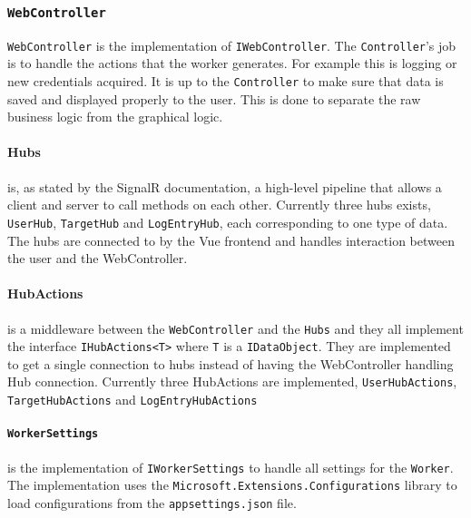 \documentclass{article}
\begin{document}
\subsubsection{\texttt{WebController}} \texttt{WebController} is the implementation of \texttt{IWebController}. The \texttt{Controller}'s job is to handle the actions that the worker generates. For example this is logging or new credentials acquired. It is up to the \texttt{Controller} to make sure that data is saved and displayed properly to the user. This is done to separate the raw business logic from the graphical logic.

\paragraph{Hubs} is, as stated by the SignalR documentation, a high-level pipeline that allows a client and server to call methods on each other\cite{url:implementation:signalr}. Currently three hubs exists, \texttt{UserHub}, \texttt{TargetHub} and \texttt{LogEntryHub}, each corresponding to one type of data. The hubs are connected to by the Vue frontend and handles interaction between the user and the WebController.

\paragraph{HubActions} is a middleware between the \texttt{WebController} and the \texttt{Hubs} and they all implement the interface \texttt{IHubActions<T>} where \texttt{T} is a \texttt{IDataObject}. They are implemented to get a single connection to hubs instead of having the WebController handling Hub connection. Currently three HubActions are implemented, \texttt{UserHubActions}, \texttt{TargetHubActions} and \texttt{LogEntryHubActions}

\paragraph{\texttt{WorkerSettings}} is the implementation of \texttt{IWorkerSettings} to handle all settings for the \texttt{Worker}. The implementation uses the \texttt{Microsoft.Extensions.Configurations} library to load configurations from the \texttt{appsettings.json} file.
\end{document}
